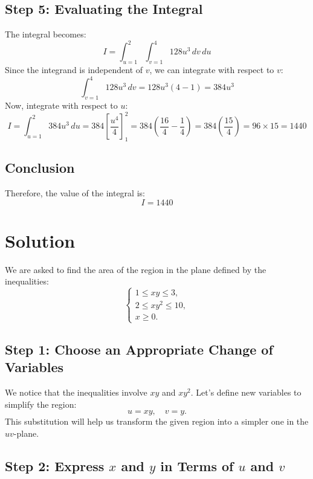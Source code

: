 \documentclass[11pt]{article}
\begin{document}
\subsection{Step 5: Evaluating the Integral}

The integral becomes:
\[
I = \int_{u=1}^2 \int_{v=1}^4 128 u^3 \, dv \, du
\]
Since the integrand is independent of \( v \), we can integrate with respect to \( v \):
\[
\int_{v=1}^4 128 u^3 \, dv = 128 u^3 (4 - 1) = 384 u^3
\]
Now, integrate with respect to \( u \):
\[
I = \int_{u=1}^2 384 u^3 \, du = 384 \left[ \dfrac{u^4}{4} \right]_1^2 = 384 \left( \dfrac{16}{4} - \dfrac{1}{4} \right) = 384 \left( \dfrac{15}{4} \right) = 96 \times 15 = 1440
\]

\newpage

\subsection{Conclusion}

Therefore, the value of the integral is:
\[
I = 1440
\]




\newpage

\section{Solution}

We are asked to find the area of the region in the plane defined by the inequalities:
\[
\begin{cases}
1 \leq x y \leq 3, \\
2 \leq x y^2 \leq 10, \\
x \geq 0.
\end{cases}
\]

\newpage

\subsection{Step 1: Choose an Appropriate Change of Variables}

We notice that the inequalities involve \( x y \) and \( x y^2 \). Let's define new variables to simplify the region:
\[
u = x y, \quad v = y.
\]
This substitution will help us transform the given region into a simpler one in the \( uv \)-plane.

\newpage

\subsection{Step 2: Express \( x \) and \( y \) in Terms of \( u \) and \( v \)}
\end{document}
